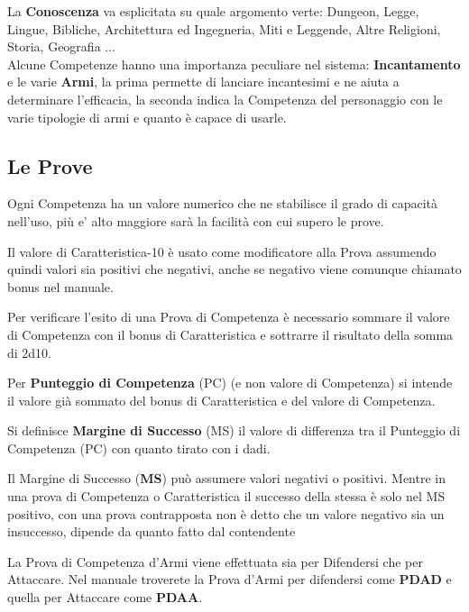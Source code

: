 \documentclass[12pt,a4paper,twoside,openany]{book}
\begin{document}
La \textbf{Conoscenza} va esplicitata su quale argomento verte: Dungeon, Legge, Lingue, Bibliche, Architettura ed Ingegneria, Miti e Leggende, Altre Religioni, Storia, Geografia ...\\

Alcune Competenze hanno una importanza peculiare nel sistema: \textbf{Incantamento} e le varie \textbf{Armi}, la prima permette di lanciare incantesimi e ne aiuta a determinare l'efficacia, la seconda indica la Competenza del personaggio con le varie tipologie di armi e quanto è capace di usarle.

\begin{multicols}{2}
	
\subsection{Le Prove}

Ogni Competenza ha un valore numerico che ne stabilisce il grado di capacità nell'uso, più e' alto maggiore sarà la facilità con cui supero le prove.

Il valore di Caratteristica-10 è usato come modificatore alla Prova assumendo quindi valori sia positivi che negativi, anche se negativo viene comunque chiamato bonus nel manuale.

Per verificare l'esito di una Prova di Competenza è necessario sommare il valore di Competenza con il bonus di Caratteristica e sottrarre il risultato della somma di 2d10.

Per \textbf{Punteggio di Competenza} (PC) (e non valore di Competenza) si intende il valore già sommato del bonus di Caratteristica e del valore di Competenza.

Si definisce \textbf{Margine di Successo} (MS) il valore di differenza tra il Punteggio di Competenza (PC) con quanto tirato con i dadi.

Il Margine di Successo (\textbf{MS}) può assumere valori negativi o positivi. Mentre in una prova di Competenza o Caratteristica il successo della stessa è solo nel MS positivo, con una prova contrapposta non è detto che un valore negativo sia un insuccesso, dipende da quanto fatto dal contendente

La Prova di Competenza d'Armi viene effettuata sia per Difendersi che per Attaccare. Nel manuale troverete la Prova d'Armi per difendersi come \textbf{PDAD} e quella per Attaccare come \textbf{PDAA}.
 

\end{multicols}
\end{document}
